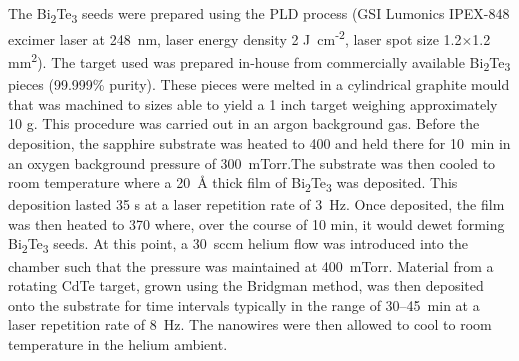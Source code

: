 The Bi\textsubscript{2}Te\textsubscript{3} seeds were prepared using the PLD process (GSI Lumonics IPEX-848 excimer laser at 248~nm, laser energy density 2 J~cm\textsuperscript{-2}, laser spot size  1.2\(\times\)1.2 mm\textsuperscript{2}).
The target used was prepared in-house from commercially available Bi\textsubscript{2}Te\textsubscript{3} pieces (99.999\% purity).
These pieces were
melted in a cylindrical graphite mould that was machined to sizes able to yield a 1 inch target weighing approximately 10 g.
This procedure was carried out in an argon background gas.
Before the deposition, the sapphire substrate was heated to 400\celsius{} and held there for 10~min in an oxygen background pressure of 300~mTorr.The substrate was then cooled to room temperature where a 20~\AA{} thick film of Bi\textsubscript{2}Te\textsubscript{3} was deposited.
This deposition lasted 35 s at a laser repetition rate of 3~Hz.
Once deposited, the film was then heated to 370\celsius{} where, over the course of 10 min, it would dewet forming Bi\textsubscript{2}Te\textsubscript{3} seeds.
At this point, a 30~sccm helium flow was introduced into the chamber such that the pressure was maintained at 400~mTorr.
Material from a rotating CdTe target, grown using the Bridgman method, was then deposited onto the substrate for time intervals typically in the range of 30--45~min at a laser repetition rate of 8~Hz.
The nanowires were then allowed to cool to room temperature in the helium ambient.

